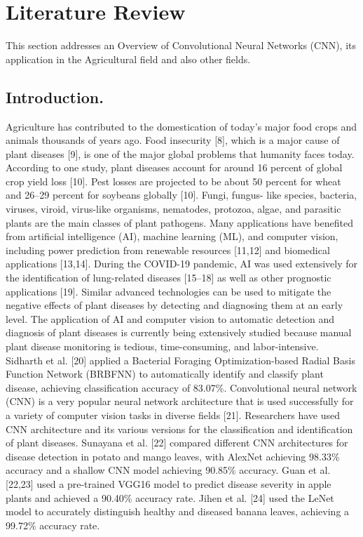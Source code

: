 \documentclass[11pt]{report}
\begin{document}
\newpage
\chapter{Literature Review}
This section addresses an Overview of Convolutional Neural Networks (CNN), its application in the Agricultural field and also other fields.\\

\section{Introduction.}
Agriculture has contributed to the domestication of today’s major food crops and animals
thousands of years ago. Food insecurity [8], which is a major cause of plant diseases [9], is
one of the major global problems that humanity faces today. According to one study, plant
diseases account for around 16 percent of global crop yield loss [10]. Pest losses are projected
to be about 50 percent for wheat and 26–29 percent for soybeans globally [10]. Fungi, fungus-
like species, bacteria, viruses, viroid, virus-like organisms, nematodes, protozoa, algae, and
parasitic plants are the main classes of plant pathogens. Many applications have benefited from artificial intelligence (AI), machine learning (ML), and computer vision, including
power prediction from renewable resources [11,12] and biomedical applications [13,14]. During
the COVID-19 pandemic, AI was used extensively for the identification of lung-related
diseases [15–18] as well as other prognostic applications [19]. Similar advanced technologies
can be used to mitigate the negative effects of plant diseases by detecting and diagnosing
them at an early level. The application of AI and computer vision to automatic detection
and diagnosis of plant diseases is currently being extensively studied because manual plant
disease monitoring is tedious, time-consuming, and labor-intensive. Sidharth et al. [20]
applied a Bacterial Foraging Optimization-based Radial Basis Function Network (BRBFNN)
to automatically identify and classify plant disease, achieving classification accuracy of
83.07\%. Convolutional neural network (CNN) is a very popular neural network architecture
that is used successfully for a variety of computer vision tasks in diverse fields [21].
Researchers have used CNN architecture and its various versions for the classification and
identification of plant diseases. Sunayana et al. [22] compared different CNN architectures
for disease detection in potato and mango leaves, with AlexNet achieving 98.33\% accuracy
and a shallow CNN model achieving 90.85\% accuracy. Guan et al. [22,23] used a pre-trained
VGG16 model to predict disease severity in apple plants and achieved a 90.40\% accuracy
rate. Jihen et al. [24] used the LeNet model to accurately distinguish healthy and diseased
banana leaves, achieving a 99.72\% accuracy rate.\\
\end{document}
